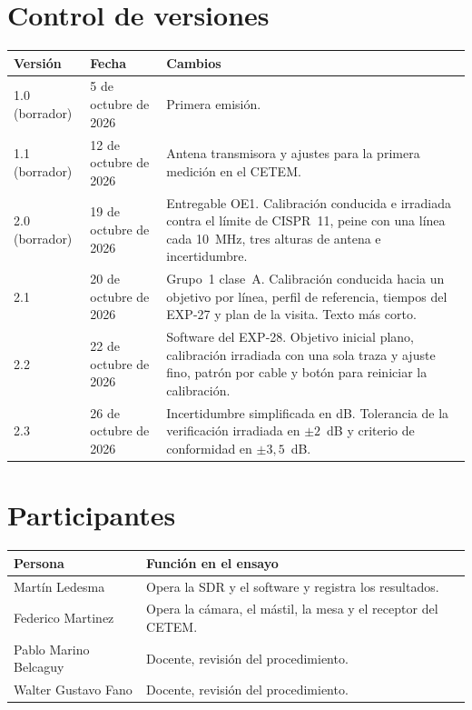 \documentclass[11pt,a4paper]{article}
\newcommand{\fecha}{26 de octubre de 2026}
\begin{document}
\section*{Control de versiones}
\begin{tabular}{@{}llp{8cm}@{}}
  \toprule
  Versión & Fecha & Cambios \\
  \midrule
  1.0 (borrador) & 5 de octubre de 2026 & Primera emisión. \\
  1.1 (borrador) & 12 de octubre de 2026 & Antena transmisora y ajustes para la primera medición en el CETEM. \\
  2.0 (borrador) & 19 de octubre de 2026 & Entregable OE1. Calibración conducida e irradiada contra el límite de CISPR~11, peine con una línea cada 10~MHz, tres alturas de antena e incertidumbre. \\
  2.1 & 20 de octubre de 2026 & Grupo~1 clase~A. Calibración conducida hacia un objetivo por línea, perfil de referencia, tiempos del EXP-27 y plan de la visita. Texto más corto. \\
  2.2 & 22 de octubre de 2026 & Software del EXP-28. Objetivo inicial plano, calibración irradiada con una sola traza y ajuste fino, patrón por cable y botón para reiniciar la calibración. \\
  2.3 & \fecha & Incertidumbre simplificada en dB. Tolerancia de la verificación irradiada en $\pm 2$~dB y criterio de conformidad en $\pm 3{,}5$~dB. \\
  \bottomrule
\end{tabular}

\section*{Participantes}
\begin{tabular}{@{}lp{10cm}@{}}
  \toprule
  Persona & Función en el ensayo \\
  \midrule
  Martín Ledesma        & Opera la SDR y el software y registra los resultados. \\
  Federico Martinez     & Opera la cámara, el mástil, la mesa y el receptor del CETEM. \\
  Pablo Marino Belcaguy & Docente, revisión del procedimiento. \\
  Walter Gustavo Fano   & Docente, revisión del procedimiento. \\
  \bottomrule
\end{tabular}

\tableofcontents
\newpage
\end{document}
